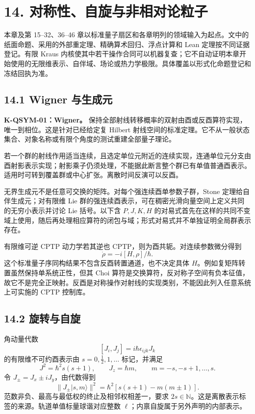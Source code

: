 \documentclass[
  11pt,
  oneside]{book}
\begin{document}
\hypertarget{ch-14}{%
\chapter{14. 对称性、自旋与非相对论粒子}\label{ch-14}}

本章及第 15--32、36--46
章以标准量子扇区和各章明列的领域输入为起点。文中的纸面命题、采用的外部重定理、精确算术回归、浮点计算和
Lean 定理按不同证据登记。有限 Kraus
内核使其中若干操作合同可以机器复查；它不自动证明本章开始使用的无限维表示、自伴域、场论或热力学极限。具体覆盖以形式化命题登记和冻结回执为准。

\hypertarget{wigner-ux4e0eux751fux6210ux5143}{%
\section{14.1 Wigner 与生成元}\label{wigner-ux4e0eux751fux6210ux5143}}

\textbf{K-QSYM-01：Wigner。}
保持全部射线转移概率的双射由酉或反酉算符实现，唯一到相位。这是针对已经给定复
Hilbert
射线空间的标准定理。它不从一般状态集合、对象名称或有限个角度的测试重建全部量子理论。

若一个群的射线作用适当连续，且选定单位元附近的连续实现，连通单位元分支由酉射影表示实现；射影乘子仍须处理，不能据此断言整个群已有单值普通酉表示。适用时可转到覆盖群或中心扩张。离散时间反演可以反酉。

无界生成元不是任意可交换的矩阵。对每个强连续酉单参数子群，Stone
定理给自伴生成元；对有限维 Lie
群的强连续酉表示，可在稠密光滑向量空间上定义共同的无穷小表示并讨论 Lie
括号。以下含 \(P,J,K,H\)
的对易式首先在这样的共同不变域上使用，随后再处理相应算符的闭包与域；形式对易式并不单独证明全局群表示存在。

有限维可逆 CPTP 动力学若其逆也 CPTP，则为酉共轭。对连续参数微分得到 \[
\dot\rho=-i[H,\rho]/\hbar.
\] 这个标准量子序同构结果不包含反酉转置通道，也不决定具体
\(H\)。例如复矩阵转置虽然保持单系统正性，但其 Choi
算符是交换算符，反对称子空间有负本征值，故它不是完全正映射。反酉是对称操作对射线的实现类别，不能因此列入任意系统上可实施的
CPTP 控制库。

\hypertarget{ux65cbux8f6cux4e0eux81eaux65cb}{%
\section{14.2 旋转与自旋}\label{ux65cbux8f6cux4e0eux81eaux65cb}}

角动量代数 \[
[J_i,J_j]=i\hbar\epsilon_{ijk}J_k
\] 的有限维不可约酉表示由 \(s=0,\tfrac12,1,\ldots\) 标记，并满足 \[
J^2=\hbar^2s(s+1),\qquad J_z=\hbar m,
\qquad m=-s,-s+1,\ldots,s.
\] 令 \(J_\pm=J_x\pm iJ_y\)，由代数得到 \[
\|J_\pm|s,m\rangle\|^2
=\hbar^2[s(s+1)-m(m\pm1)].
\] 范数非负、最高与最低权的终止及相邻权相差一，要求
\(2s\in\mathbb N\)。这是离散表示标签的来源。轨道单值标量球谐对应整数
\(\ell\)；内禀自旋属于另外声明的内部表示。
\end{document}
